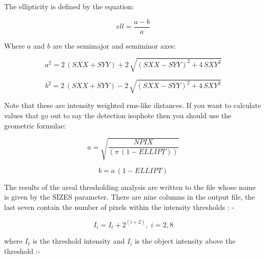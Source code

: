 The ellipticity is defined by the equation:
\begin{center}
\begin{displaymath}
ell = \frac{a-b}{a}
\end{displaymath}
\end{center}
Where $a$ and $b$ are the semimajor and semiminor axes:
\begin{center}
\begin{displaymath}
a^{2} = 2\,(SXX + SYY) +2\,\sqrt{(SXX - SYY)^{2} +4\,SXY^{2}}
\end{displaymath}
\end{center}
\begin{center}
\begin{displaymath}
b^{2} = 2\,(SXX + SYY) -2\,\sqrt{(SXX - SYY)^{2} +4\,SXY^{2}}
\end{displaymath}
\end{center}
Note that these are intensity weighted rms-like distances. If you 
want to calculate values that go out to say the detection isophote
then you should use the geometric formulae:
\begin{center}
\begin{displaymath}
a = \sqrt{\frac{NPIX}{(\pi\,(1-ELLIPT))}}
\end{displaymath}
\end{center}
\begin{center}
\begin{displaymath}
b = a\,(1-ELLIPT)
\end{displaymath}
\end{center}

The results of the areal thresholding analysis are written to the
file whose name is given by the SIZES parameter.  There are nine
columns in the output file, the last seven contain the number of pixels
within the intensity thresholds : -
\begin{center}
\begin{displaymath}
 I_{i} = I_{t} + 2^{(i+2)},\; i=2,8
\end{displaymath}
\end{center}
where $I_{t}$ is the threshold intensity and $I_{i}$ is the object
intensity above the threshold :-

